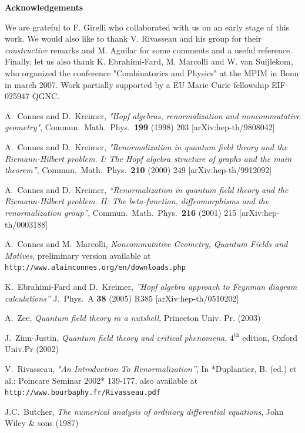 \documentclass[10pt,here,feynmf]{article}
\begin{document}
{\bf Acknowledgements}

We are grateful to F. Girelli who collaborated with us on an early stage of this work. We would also like to thank V. Rivasseau and his group for their \emph{constructive} remarks and M. Aguilar for some comments and a useful reference. Finally, let us also thank K. Ebrahimi-Fard, M. Marcolli and W. van Suijlekom, who organized the conference "Combinatorics and Physics" at the MPIM in Bonn in march 2007. Work partially supported by a EU Marie Curie fellowship EIF-025947 QGNC.

\begin{thebibliography}{99}
  A.~Connes and D.~Kreimer,
  {\it "Hopf algebras, renormalization and noncommutative geometry"},
  Commun.\ Math.\ Phys.\  {\bf 199} (1998) 203
  [arXiv:hep-th/9808042]


  A.~Connes and D.~Kreimer,
  {\it "Renormalization in quantum field theory and the Riemann-Hilbert  problem.
  I: The Hopf algebra structure of graphs and the main theorem''},
  Commun.\ Math.\ Phys.\  {\bf 210} (2000) 249
  [arXiv:hep-th/9912092]

  A.~Connes and D.~Kreimer,
  {\it ``Renormalization in quantum field theory and the Riemann-Hilbert  problem.
  II: The beta-function, diffeomorphisms and the renormalization  group''},
  Commun.\ Math.\ Phys.\  {\bf 216} (2001) 215
  [arXiv:hep-th/0003188]

A.~Connes and M.~Marcolli, {\it Noncommutative Geometry, Quantum Fields and Motives}, preliminary version available at {\tt http://www.alainconnes.org/en/downloads.php}

  K.~Ebrahimi-Fard and D.~Kreimer,
  {\it ''Hopf algebra approach to Feynman diagram calculations''}
  J.\ Phys.\ A  {\bf 38} (2005) R385
  [arXiv:hep-th/0510202]

  A.~Zee,
  {\it Quantum field theory in a nutshell}, Princeton Univ. Pr. (2003)

J.~Zinn-Justin,
  {\it Quantum field theory and critical phenomena}, $4^{\mathrm{th}}$ edition,
  Oxford Univ.Pr (2002) 


  V.~Rivasseau,
  {\it "An Introduction To Renormalization''},
  In *Duplantier, B. (ed.) et al.: Poincare Seminar 2002* 139-177, also available at {\tt http://www.bourbaphy.fr/Rivasseau.pdf}

J.C.~Butcher, {\it The numerical analysis of ordinary differential equations}, John Wiley \& sons (1987) 



\end{thebibliography}
\end{document}
